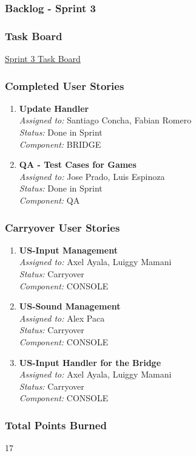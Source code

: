 \subsubsection{Backlog - Sprint 3}
\subsubsection*{Task Board}
\href{https://tree.taiga.io/project/joseluis-teran-coffeetime/taskboard/sprint-3}{Sprint 3 Task Board}

\subsubsection*{Completed User Stories}

\begin{enumerate}
    \item \textbf{Update Handler} \\
    \textit{Assigned to:} Santiago Concha, Fabian Romero \\
    \textit{Status:} Done in Sprint \\
    \textit{Component:} BRIDGE
    \item \textbf{QA - Test Cases for Games} \\
    \textit{Assigned to:} Jose Prado, Luis Espinoza \\
    \textit{Status:} Done in Sprint \\
    \textit{Component:} QA
\end{enumerate}

\subsubsection*{Carryover User Stories}

\begin{enumerate}
    \item \textbf{US-Input Management} \\
    \textit{Assigned to:} Axel Ayala, Luiggy Mamani \\
    \textit{Status:} Carryover \\
    \textit{Component:} CONSOLE
    \item \textbf{US-Sound Management} \\
    \textit{Assigned to:} Alex Paca \\
    \textit{Status:} Carryover \\
    \textit{Component:} CONSOLE
    \item \textbf{US-Input Handler for the Bridge} \\
    \textit{Assigned to:} Axel Ayala, Luiggy Mamani \\
    \textit{Status:} Carryover \\
    \textit{Component:} CONSOLE
\end{enumerate}

\subsubsection*{Total Points Burned}
17